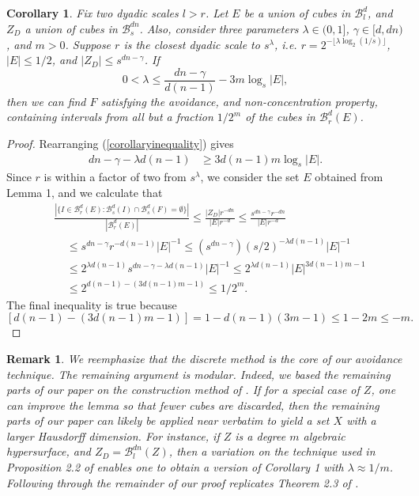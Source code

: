 \documentclass[dvipsnames]{article}
\theoremstyle{plain}
\newtheorem{corollary}{Corollary}
\theoremstyle{plain}
\newtheorem*{remark}{Remark}
\begin{document}
\begin{corollary}
	Fix two dyadic scales $l > r$. Let $E$ be a union of cubes in $\mathcal{B}^d_l$, and $Z_D$ a union of cubes in $\mathcal{B}^{dn}_s$. Also, consider three parameters $\lambda \in (0,1]$, $\gamma \in [d,dn)$, and $m > 0$. Suppose $r$ is the closest dyadic scale to $s^\lambda$, i.e. $r = 2^{- \lfloor \lambda \log_2(1/s) \rfloor}$, $|E| \leq 1/2$, and $|Z_D| \leq s^{dn-\gamma}$. If
	\begin{equation} \label{corollaryinequality}
		0 < \lambda \leq \frac{dn - \gamma}{d(n-1)} - 3 m \log_s |E|,
	\end{equation}
	then we can find $F$ satisfying the avoidance, and non-concentration property, containing intervals from all but a fraction $1/2^m$ of the cubes in $\mathcal{B}^d_r(E)$.
\end{corollary}
\begin{proof}
	Rearranging (\ref{corollaryinequality}) gives
	\begin{align*}
		dn - \gamma - \lambda d(n-1) &\geq 3d(n-1) m \log_s |E|.
	\end{align*}
	Since $r$ is within a factor of two from $s^\lambda$, we consider the set $E$ obtained from Lemma 1, and we calculate that
	\begin{align*}
		&\frac{|\{ I \in \mathcal{B}^d_r(E): \mathcal{B}^d_s(I) \cap \mathcal{B}^d_s(F) = \emptyset \}|}{|\mathcal{B}^d_r(E)|} \leq \frac{|Z_D| r^{-dn}}{|E|r^{-d}} \leq \frac{s^{dn - \gamma} r^{-dn}}{|E| r^{-d}}\\
		&\ \ \ \ \ \leq s^{dn - \gamma} r^{-d(n-1)} |E|^{-1} \leq (s^{dn - \gamma}) (s/2)^{- \lambda d(n-1)} |E|^{-1}\\
		&\ \ \ \ \ \leq 2^{\lambda d(n-1)} s^{dn - \gamma - \lambda d(n-1)} |E|^{-1} \leq 2^{\lambda d(n-1)} |E|^{3d(n-1)m - 1}\\
		&\ \ \ \ \ \leq 2^{d(n-1) - (3d(n-1)m - 1)} \leq 1/2^m.
	\end{align*}
	The final inequality is true because
	\[ [d(n-1) - (3d(n-1)m - 1)] =  1 - d(n-1)(3m - 1) \leq 1 - 2m \leq -m. \tag*{\qedhere} \]
\end{proof}

\begin{remark}
	We reemphasize that the discrete method is the core of our avoidance technique. The remaining argument is modular. Indeed, we based the remaining parts of our paper on the construction method of \cite{MalabikaRob}. If for a special case of $Z$, one can improve the lemma so that fewer cubes are discarded, then the remaining parts of our paper can likely be applied near verbatim to yield a set $X$ with a larger Hausdorff dimension. For instance, if $Z$ is a degree $m$ algebraic hypersurface, and $Z_D = \mathcal{B}^{dn}_l(Z)$, then a variation on the technique used in Proposition 2.2 of \cite{Mathe} enables one to obtain a version of Corollary 1 with $\lambda \approx 1/m$. Following through the remainder of our proof replicates Theorem 2.3 of \cite{Mathe}.
\end{remark}
\end{document}
